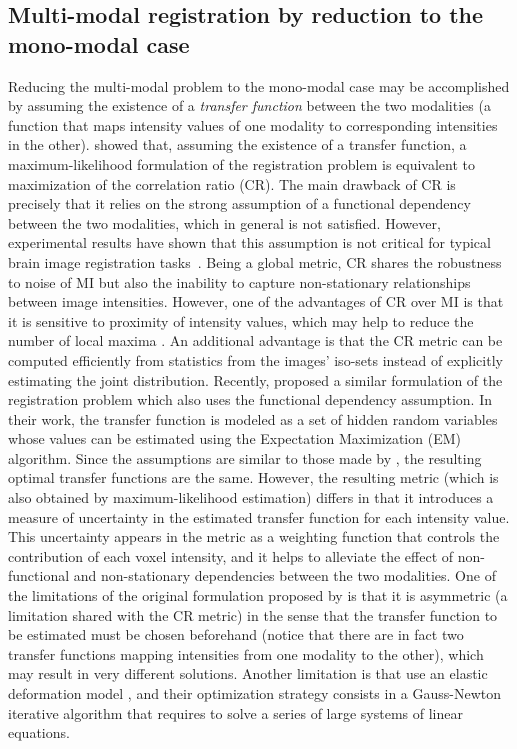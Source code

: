 \subsection{Multi-modal registration by reduction to the mono-modal case}
Reducing the multi-modal problem to the mono-modal case may be accomplished by assuming the existence of a {\it transfer function} between the two modalities (a function that maps intensity values of one modality to corresponding intensities in the other). \cite{Roche2000} showed that, assuming the existence of a transfer function, a maximum-likelihood formulation of the registration problem is equivalent to maximization of the correlation ratio (CR). The main drawback of CR is precisely that it relies on the strong assumption of a functional dependency between the two modalities, which in general is not satisfied. However, experimental results have shown that this assumption is not critical for typical brain image registration tasks~\citep{Roche1998}. Being a global metric, CR shares the robustness to noise of MI but also the inability to capture non-stationary relationships between image intensities. However, one of the advantages of CR over MI is that it is sensitive to proximity of intensity values, which may help to reduce the number of local maxima \citep{Roche1998}. An additional advantage is that the CR metric can be computed efficiently from statistics from the images' iso-sets instead of explicitly estimating the joint distribution. Recently, \cite{Arce-santana2014} proposed a similar formulation of the registration problem which also uses the functional dependency assumption. In their work, the transfer function is modeled as a set of hidden random variables whose values can be estimated using the Expectation Maximization (EM) algorithm. Since the assumptions are similar to those made by \cite{Roche1998, Roche2000}, the resulting optimal transfer functions are the same. However, the resulting metric (which is also obtained by maximum-likelihood estimation) differs in that it introduces a measure of uncertainty in the estimated transfer function for each intensity value. This uncertainty appears in the metric as a weighting function that controls the contribution of each voxel intensity, and it helps to alleviate the effect of non-functional and non-stationary dependencies between the two modalities. One of the limitations of the original formulation proposed by \cite{Arce-santana2014} is that it is asymmetric (a limitation shared with the CR metric) in the sense that the transfer function to be estimated must be chosen beforehand (notice that there are in fact two transfer functions mapping intensities from one modality to the other), which may result in very different solutions. Another limitation is that \cite{Arce-santana2014} use an elastic deformation model \citep{Bajcsy1982, Gee1999}, and their optimization strategy consists in a Gauss-Newton iterative algorithm \citep{GVK502988711} that requires to solve a series of large systems of linear equations.

